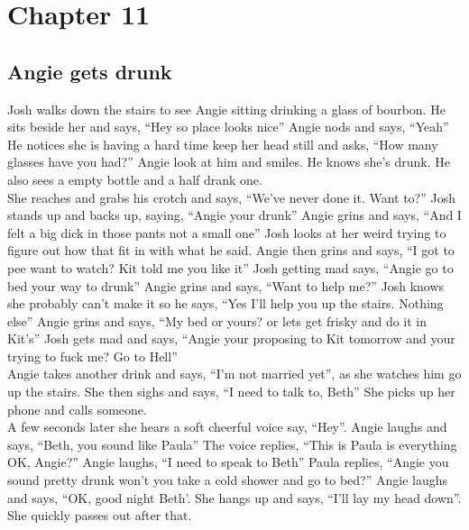 \documentclass{article}[12px]
\begin{document}
\section*{Chapter 11}
\subsection* {Angie gets drunk}
	Josh walks down the stairs to see Angie sitting drinking a glass of bourbon. He sits beside her and says, ``Hey so place looks nice'' Angie nods and says, ``Yeah'' He notices she is having a hard time keep her head still and asks, ``How many glasses have you had?'' Angie look at him and smiles. He knows she's drunk. He also sees a empty bottle and a half drank one.\\
	
	She reaches and grabs his crotch and says, ``We've never done it. Want to?'' Josh stands up and backs up, saying, ``Angie your drunk'' Angie grins and says, ``And I felt a big dick in those pants not a small one'' Josh looks at her weird trying to figure out how that fit in with what he said. Angie then grins and says, ``I got to pee want to watch? Kit told me you like it'' Josh getting mad says, ``Angie go to bed your way to drunk'' Angie grins and says, ``Want to help me?'' Josh knows she probably can't make it so he says, ``Yes I'll help you up the stairs. Nothing else'' Angie grins and says, ``My bed or yours? or lets get frisky and do it in Kit's'' Josh gets mad and says, ``Angie your proposing to Kit tomorrow and your trying to fuck me? Go to Hell''\\ 
	
	Angie takes another drink and says, ``I'm not married yet'', as  she watches him go up the stairs.  She then sighs and says, ``I need to talk to, Beth'' She picks up her phone and calls someone. \\
	
	A few seconds later she hears a soft cheerful voice say, ``Hey''. Angie laughs and says, ``Beth, you sound like Paula'' The voice replies, ``This is Paula is everything OK, Angie?'' Angie laughs, ``I need to speak to Beth'' Paula replies, ``Angie you sound pretty drunk won't you take a cold shower and go to bed?'' Angie laughs and says, ``OK, good night Beth'. She hangs up and says, ``I'll lay my head down''. She quickly passes out after that.\\
	
\end{document}
